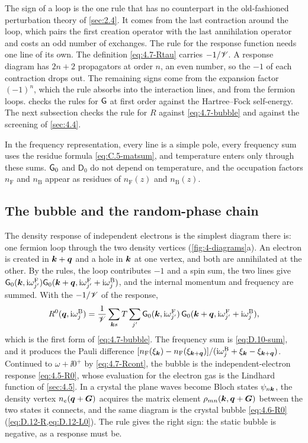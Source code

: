 The sign of a loop is the one rule that has no counterpart in the old-fashioned perturbation theory of \cref{sec:2.4}. It comes from the last contraction around the loop, which pairs the first creation operator with the last annihilation operator and costs an odd number of exchanges. The rule for the response function needs one line of its own. The definition \cref{eq:4.7-Rtau} carries $-1/\mathscr{V}$. A response diagram has $2n + 2$ propagators at order $n$, an even number, so the $-1$ of each contraction drops out. The remaining signs come from the expansion factor $(-1)^n$, which the rule absorbs into the interaction lines, and from the fermion loops.  checks the rules for $\mathsf{G}$ at first order against the Hartree--Fock self-energy. The next subsection checks the rule for $R$ against \cref{eq:4.7-bubble} and against the screening of \cref{sec:4.4}.

In the frequency representation, every line is a simple pole, every frequency sum uses the residue formula \cref{eq:C.5-matsum}, and temperature enters only through these sums. $\mathsf{G}_0$ and $\mathsf{D}_0$ do not depend on temperature, and the occupation factors $n_{\mathrm{F}}$ and $n_{\mathrm{B}}$ appear as residues of $n_{\mathrm{F}}(z)$ and $n_{\mathrm{B}}(z)$.

\subsection{The bubble and the random-phase chain}

The density response of independent electrons is the simplest diagram there is: one fermion loop through the two density vertices (\cref{fig:4-diagrams}a). An electron is created in $\bm{k} + \bm{q}$ and a hole in $\bm{k}$ at one vertex, and both are annihilated at the other. By the rules, the loop contributes $-1$ and a spin sum, the two lines give $\mathsf{G}_0(\bm{k},\mathrm{i}\omega^{\mathrm{F}}_{j'})\mathsf{G}_0(\bm{k}+\bm{q},\mathrm{i}\omega^{\mathrm{F}}_{j'} + \mathrm{i}\omega^{\mathrm{B}}_j)$, and the internal momentum and frequency are summed. With the $-1/\mathscr{V}$ of the response,
\begin{equation}
  R^0(\bm{q},\mathrm{i}\omega^{\mathrm{B}}_j) = \frac1{\mathscr{V}}\sum_{\bm{k}s}T\sum_{j'}\mathsf{G}_0(\bm{k},\mathrm{i}\omega^{\mathrm{F}}_{j'})\,\mathsf{G}_0(\bm{k}+\bm{q},\mathrm{i}\omega^{\mathrm{F}}_{j'} + \mathrm{i}\omega^{\mathrm{B}}_j) ,
  \label{eq:4.8-bubble}
\end{equation}
which is the first form of \cref{eq:4.7-bubble}. The frequency sum is \cref{eq:D.10-sum}, and it produces the Pauli difference $[n_{\mathrm{F}}(\xi_{\bm{k}}) - n_{\mathrm{F}}(\xi_{\bm{k}+\bm{q}})]/(\mathrm{i}\omega^{\mathrm{B}}_j + \xi_{\bm{k}} - \xi_{\bm{k}+\bm{q}})$. Continued to $\omega + \ii0^+$ by \cref{eq:4.7-Rcont}, the bubble is the independent-electron response \cref{eq:4.5-R0}, whose evaluation for the electron gas is the Lindhard function of \cref{sec:4.5}. In a crystal the plane waves become Bloch states $\psi_{n\bm{k}}$, the density vertex $n_e(\bm{q}+\bm{G})$ acquires the matrix element $\rho_{mn}(\bm{k},\bm{q}+\bm{G})$ between the two states it connects, and the same diagram is the crystal bubble \cref{eq:4.6-R0} (\cref{eq:D.12-R,eq:D.12-L0}). The rule gives the right sign: the static bubble is negative, as a response must be.

